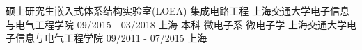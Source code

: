 

\begin{cventries}

  \cventry
    {\hspace{0.75cm}硕士研究生\hspace{0.25cm}嵌入式体系结构实验室(LOEA)\hspace{0.25cm} 集成电路工程} %
    {上海交通大学\hspace{0.1cm}电子信息与电气工程学院} %
    {09/2015 - 03/2018} %
    {上海} %
    {
    }
    \vspace{-8pt}
    \cventry
    {\hspace{0.7cm}本科	\hspace{0.25cm}	微电子系\hspace{0.25cm} 微电子学} %
    {上海交通大学\hspace{0.1cm}电子信息与电气工程学院} %
    {09/2011 - 07/2015} %
    {上海} %
    {
    }


\end{cventries}
